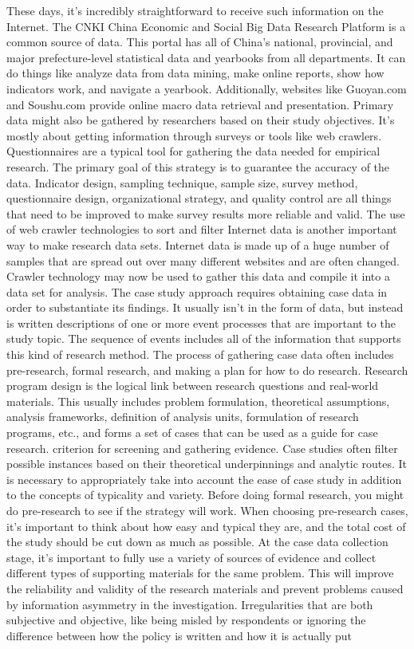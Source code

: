 \documentclass[journal]{IEEEtran}
\begin{document}
\par These days, it's incredibly straightforward to receive such information on the Internet. The CNKI China Economic and Social Big Data Research Platform is a common source of data. This portal has all of China's national, provincial, and major prefecture-level statistical data and yearbooks from all departments. It can do things like analyze data from data mining, make online reports, show how indicators work, and navigate a yearbook. Additionally, websites like Guoyan.com and Soushu.com provide online macro data retrieval and presentation. Primary data might also be gathered by researchers based on their study objectives. It's mostly about getting information through surveys or tools like web crawlers. Questionnaires are a typical tool for gathering the data needed for empirical research. The primary goal of this strategy is to guarantee the accuracy of the data. Indicator design, sampling technique, sample size, survey method, questionnaire design, organizational strategy, and quality control are all things that need to be improved to make survey results more reliable and valid. The use of web crawler technologies to sort and filter Internet data is another important way to make research data sets. Internet data is made up of a huge number of samples that are spread out over many different websites and are often changed. Crawler technology may now be used to gather this data and compile it into a data set for analysis. The case study approach requires obtaining case data in order to substantiate its findings. It usually isn't in the form of data, but instead is written descriptions of one or more event processes that are important to the study topic. The sequence of events includes all of the information that supports this kind of research method. The process of gathering case data often includes pre-research, formal research, and making a plan for how to do research. Research program design is the logical link between research questions and real-world materials. This usually includes problem formulation, theoretical assumptions, analysis frameworks, definition of analysis units, formulation of research programs, etc., and forms a set of cases that can be used as a guide for case research. criterion for screening and gathering evidence. Case studies often filter possible instances based on their theoretical underpinnings and analytic routes. It is necessary to appropriately take into account the ease of case study in addition to the concepts of typicality and variety. Before doing formal research, you might do pre-research to see if the strategy will work. When choosing pre-research cases, it's important to think about how easy and typical they are, and the total cost of the study should be cut down as much as possible. At the case data collection stage, it's important to fully use a variety of sources of evidence and collect different types of supporting materials for the same problem. This will improve the reliability and validity of the research materials and prevent problems caused by information asymmetry in the investigation. Irregularities that are both subjective and objective, like being misled by respondents or ignoring the difference between how the policy is written and how it is actually put 
\end{document}
